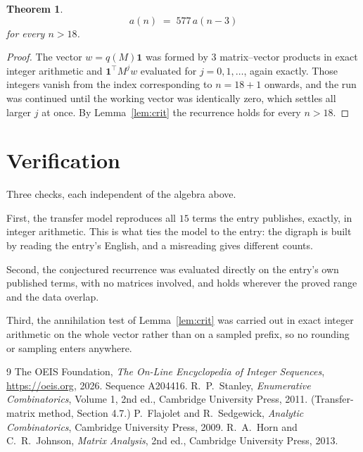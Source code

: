 \documentclass[11pt,a4paper]{article}
\theoremstyle{plain}
\newtheorem{theorem}{Theorem}
\theoremstyle{definition}
\begin{document}
\begin{theorem}
\[
a(n)\;=\;577\,a(n-3)
\]
for every $n>18$.
\end{theorem}

\begin{proof}
The vector $w=q(M)\mathbf{1}$ was formed by $3$ matrix--vector products in exact
integer arithmetic and $\mathbf{1}^{\!\top}M^{j}w$ evaluated for $j=0,1,\dots$, again
exactly. Those integers vanish from the index corresponding to $n=18+1$ onwards, and the
run was continued until the working vector was identically zero, which settles all larger $j$
at once. By Lemma~\ref{lem:crit} the recurrence holds for every $n>18$.
\end{proof}

\section{Verification}

Three checks, each independent of the algebra above.

First, the transfer model reproduces all $15$ terms the entry publishes, exactly, in
integer arithmetic. This is what ties the model to the entry: the digraph is built by reading
the entry's English, and a misreading gives different counts.

Second, the conjectured recurrence was evaluated directly on the entry's own published terms,
with no matrices involved, and holds wherever the proved range and the data overlap.

Third, the annihilation test of Lemma~\ref{lem:crit} was carried out in exact integer
arithmetic on the whole vector rather than on a sampled prefix, so no rounding or sampling
enters anywhere.

\begin{thebibliography}{9}
 The OEIS Foundation, \emph{The On-Line Encyclopedia of Integer
Sequences}, \url{https://oeis.org}, 2026. Sequence A204416.
 R.~P.~Stanley, \emph{Enumerative Combinatorics}, Volume 1, 2nd ed.,
Cambridge University Press, 2011. (Transfer-matrix method, Section 4.7.)
 P.~Flajolet and R.~Sedgewick, \emph{Analytic Combinatorics}, Cambridge
University Press, 2009.
 R.~A.~Horn and C.~R.~Johnson, \emph{Matrix Analysis}, 2nd ed., Cambridge
University Press, 2013.
\end{thebibliography}
\end{document}
